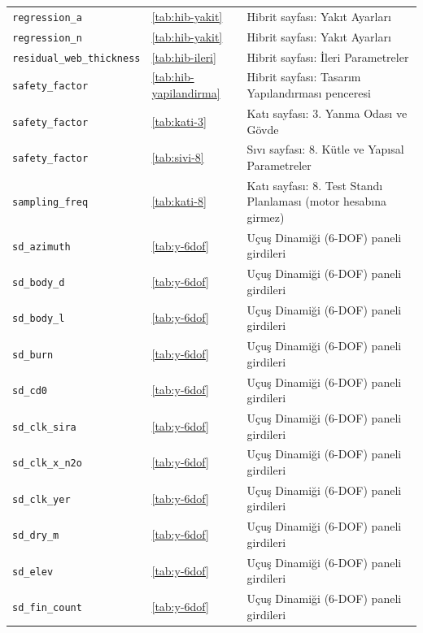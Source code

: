 \documentclass[11pt,a4paper]{article}
\begin{document}
{\begin{longtable}{@{}>{\raggedright\arraybackslash}p{5.2cm}p{1.4cm}>{\raggedright\arraybackslash}p{7.4cm}@{}}
\texttt{regression\_\allowbreak{}a} & \ref{tab:hib-yakit} & Hibrit sayfası: Yakıt Ayarları \\
\texttt{regression\_\allowbreak{}n} & \ref{tab:hib-yakit} & Hibrit sayfası: Yakıt Ayarları \\
\texttt{residual\_\allowbreak{}web\_\allowbreak{}thickness} & \ref{tab:hib-ileri} & Hibrit sayfası: İleri Parametreler \\
\texttt{safety\_\allowbreak{}factor} & \ref{tab:hib-yapilandirma} & Hibrit sayfası: Tasarım Yapılandırması penceresi \\
\texttt{safety\_\allowbreak{}factor} & \ref{tab:kati-3} & Katı sayfası: 3. Yanma Odası ve Gövde \\
\texttt{safety\_\allowbreak{}factor} & \ref{tab:sivi-8} & Sıvı sayfası: 8. Kütle ve Yapısal Parametreler \\
\texttt{sampling\_\allowbreak{}freq} & \ref{tab:kati-8} & Katı sayfası: 8. Test Standı Planlaması (motor hesabına girmez) \\
\texttt{sd\_\allowbreak{}azimuth} & \ref{tab:y-6dof} & Uçuş Dinamiği (6-DOF) paneli girdileri \\
\texttt{sd\_\allowbreak{}body\_\allowbreak{}d} & \ref{tab:y-6dof} & Uçuş Dinamiği (6-DOF) paneli girdileri \\
\texttt{sd\_\allowbreak{}body\_\allowbreak{}l} & \ref{tab:y-6dof} & Uçuş Dinamiği (6-DOF) paneli girdileri \\
\texttt{sd\_\allowbreak{}burn} & \ref{tab:y-6dof} & Uçuş Dinamiği (6-DOF) paneli girdileri \\
\texttt{sd\_\allowbreak{}cd0} & \ref{tab:y-6dof} & Uçuş Dinamiği (6-DOF) paneli girdileri \\
\texttt{sd\_\allowbreak{}clk\_\allowbreak{}sira} & \ref{tab:y-6dof} & Uçuş Dinamiği (6-DOF) paneli girdileri \\
\texttt{sd\_\allowbreak{}clk\_\allowbreak{}x\_\allowbreak{}n2o} & \ref{tab:y-6dof} & Uçuş Dinamiği (6-DOF) paneli girdileri \\
\texttt{sd\_\allowbreak{}clk\_\allowbreak{}yer} & \ref{tab:y-6dof} & Uçuş Dinamiği (6-DOF) paneli girdileri \\
\texttt{sd\_\allowbreak{}dry\_\allowbreak{}m} & \ref{tab:y-6dof} & Uçuş Dinamiği (6-DOF) paneli girdileri \\
\texttt{sd\_\allowbreak{}elev} & \ref{tab:y-6dof} & Uçuş Dinamiği (6-DOF) paneli girdileri \\
\texttt{sd\_\allowbreak{}fin\_\allowbreak{}count} & \ref{tab:y-6dof} & Uçuş Dinamiği (6-DOF) paneli girdileri \\

\end{longtable}}
\end{document}
